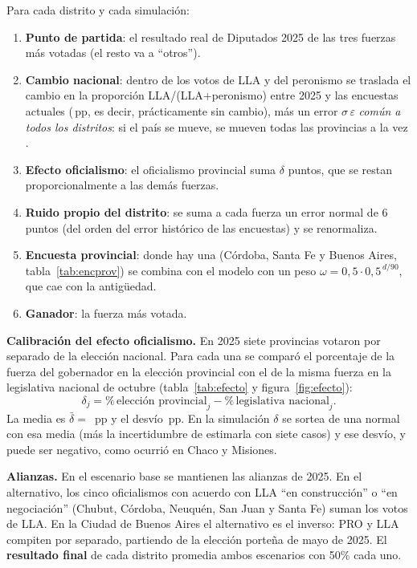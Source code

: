 \documentclass{article}
\newcommand{\pp}{\,pp}
\begin{document}
Para cada distrito y cada simulación:
\begin{enumerate}
  \item \textbf{Punto de partida}: el resultado real de Diputados 2025 de las
        tres fuerzas más votadas (el resto va a ``otros'').
  \item \textbf{Cambio nacional}: dentro de los votos de LLA y del peronismo se
        traslada el cambio en la proporción LLA/(LLA+peronismo) entre 2025 y las
        encuestas actuales (\cambioNac\pp, es decir, prácticamente sin cambio),
        más un error $\sigma\,\varepsilon$ \emph{común a todos los distritos}:
        si el país se mueve, se mueven todas las provincias a la vez
        \cite{heidemanns2020}.
  \item \textbf{Efecto oficialismo}: el oficialismo provincial suma $\delta$
        puntos, que se restan proporcionalmente a las demás fuerzas.
  \item \textbf{Ruido propio del distrito}: se suma a cada fuerza un error
        normal de 6 puntos (del orden del error histórico de las encuestas) y se
        renormaliza.
  \item \textbf{Encuesta provincial}: donde hay una (Córdoba, Santa Fe y Buenos
        Aires, tabla~\ref{tab:encprov}) se combina con el modelo con un peso
        $\omega = 0{,}5\cdot0{,}5^{\,d/90}$, que cae con la antigüedad.
  \item \textbf{Ganador}: la fuerza más votada.
\end{enumerate}

\textbf{Calibración del efecto oficialismo.} En 2025 siete provincias votaron
por separado de la elección nacional. Para cada una se comparó el porcentaje de
la fuerza del gobernador en la elección provincial con el de la misma fuerza en
la legislativa nacional de octubre (tabla~\ref{tab:efecto} y
figura~\ref{fig:efecto}):
\begin{equation}
  \delta_j = \%\,\text{elección provincial}_j - \%\,\text{legislativa nacional}_j .
\end{equation}
La media es $\bar{\delta} = $ \muDelta\pp{} y el desvío \sdDelta\pp. En la
simulación $\delta$ se sortea de una normal con esa media (más la incertidumbre
de estimarla con siete casos) y ese desvío, y puede ser negativo, como ocurrió en
Chaco y Misiones.

\textbf{Alianzas.} En el escenario base se mantienen las alianzas de 2025. En el
alternativo, los cinco oficialismos con acuerdo con LLA ``en construcción'' o
``en negociación'' (Chubut, Córdoba, Neuquén, San Juan y Santa Fe) suman los
votos de LLA. En la Ciudad de Buenos Aires el alternativo es el inverso: PRO y LLA
compiten por separado, partiendo de la elección porteña de mayo de 2025. El
\textbf{resultado final} de cada distrito promedia ambos escenarios con 50\% cada
uno.
\end{document}
